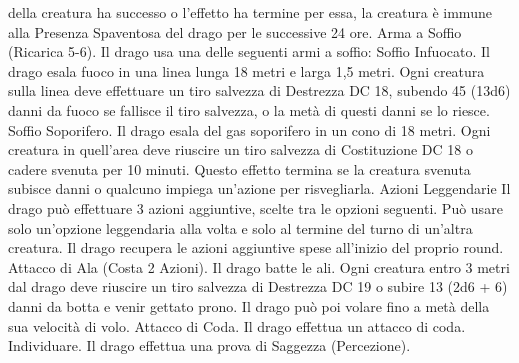 \begin{multicols}{2}
della creatura ha successo o l’effetto ha termine per essa, la creatura è
immune alla Presenza Spaventosa del drago per le successive 24 ore.
Arma a Soffio (Ricarica 5-6). Il drago usa una delle seguenti armi
a soffio:
Soffio Infuocato. Il drago esala fuoco in una linea lunga 18 metri e
larga 1,5 metri. Ogni creatura sulla linea deve effettuare un tiro
salvezza di Destrezza DC 18, subendo 45 (13d6) danni da fuoco se
fallisce il tiro salvezza, o la metà di questi danni se lo riesce.
Soffio Soporifero. Il drago esala del gas soporifero in un cono di 18
metri. Ogni creatura in quell’area deve riuscire un tiro salvezza di
Costituzione DC 18 o cadere svenuta per 10 minuti. Questo effetto
termina se la creatura svenuta subisce danni o qualcuno impiega
un’azione per risvegliarla.
Azioni Leggendarie
Il drago può effettuare 3 azioni aggiuntive, scelte tra le opzioni
seguenti. Può usare solo un’opzione leggendaria alla volta e solo
al termine del turno di un’altra creatura. Il drago recupera le
azioni aggiuntive spese all’inizio del proprio round.
Attacco di Ala (Costa 2 Azioni). Il drago batte le ali. Ogni
creatura entro 3 metri dal drago deve riuscire un tiro salvezza di
Destrezza DC 19 o subire 13 (2d6 + 6) danni da botta e venir
gettato prono. Il drago può poi volare fino a metà della sua
velocità di volo.
Attacco di Coda. Il drago effettua un attacco di coda.
Individuare. Il drago effettua una prova di Saggezza
(Percezione).
 

\end{multicols}
